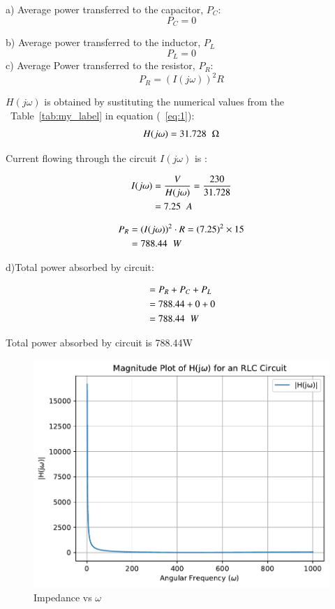 \documentclass[journal,12pt,twocolumn]{IEEEtran}
\newcommand\tabref{Table~\ref}
\providecommand{\brak}[1]{\ensuremath{\left(#1\right)}}
\theoremstyle{remark}
\begin{document}
a) Average power transferred to the capacitor, $P_C$:
\\ 
\begin{equation}
	P_C = 0
\end{equation}	
  
b) Average power transferred to the inductor, $P_L$
\begin{equation}
	P_L = 0
\end{equation}
c) Average Power transferred to the resistor, $P_R$:
\begin{equation}
	P_R = (I(j\omega))^2R
\end{equation} 


$H(j\omega)$ is obtained by sustituting the numerical values from the ~\tabref{tab:my_label} in equation (~\ref{eq:1}):
 \begin{align}
 H(j\omega)=31.728\hspace{0.2cm}\ohm
\end{align}	



Current flowing through the circuit $I(j\omega)$ is :

\begin{align}
	I(j\omega)&=\frac{V}{H(j\omega)}=\frac{230}{31.728}
	\\&=7.25\hspace{0.2cm}A
\end{align}

\begin{align}
	P_R &= (I(j\omega))^2\cdot R = \brak{7.25}^2 \times 15
	\\&=788.44\hspace{0.2cm}W
\end{align}



d)Total power absorbed by circuit:

\begin{align}
	&= P_R + P_C + P_L
	\\&= 788.44 + 0 + 0
	\\&= 788.44\hspace{0.2cm}W
\end{align}

Total power absorbed by circuit is 788.44\hspace{0.01cm}W

\vspace{1cm}

\begin{figure}[h!]
	\centering
	\includegraphics[width=\columnwidth]{figs/magnitude_plot.pdf}
	\caption{Impedance vs $\omega$}
	\label{fig:magnitude_plot}
\end{figure}

 
\end{document}
